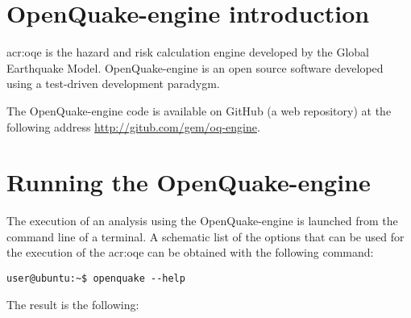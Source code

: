\section{OpenQuake-engine introduction}
\gls{acr:oqe} is the hazard and risk calculation engine developed by
the Global Earthquake Model. OpenQuake-engine is an open source software
developed using a test-driven development paradygm. 

The OpenQuake-engine code is available on GitHub (a web repository)
at the following address \href{http://gitub.com/gem/oq-engine}{http://gitub.com/gem/oq-engine}.
\section{Running the OpenQuake-engine}
\label{sec:intro}
The execution of an analysis using the OpenQuake-engine is launched from 
the command line of a terminal. A schematic list of the options that 
can be used for the execution of the \gls{acr:oqe} can be obtained 
with the following command:
\begin{Verbatim}[frame=single, commandchars=\\\{\}, fontsize=\small]
user@ubuntu:~$ openquake --help
\end{Verbatim}
The result is the following:


